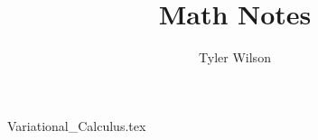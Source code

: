 \documentclass[11pt, fleqn]{article}
\title{Math Notes}
\author{Tyler Wilson}
\date{}
\begin{document}
\allowdisplaybreaks

\maketitle
\tableofcontents

{Variational_Calculus.tex}
\end{document}

